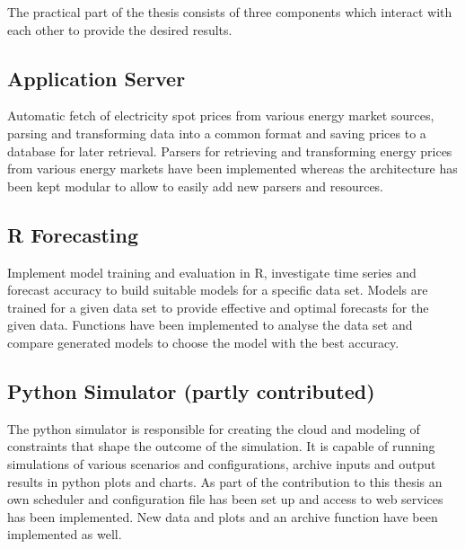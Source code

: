 \documentclass[paper=a4, fontsize=11pt]{scrartcl} %
\numberwithin{equation}{section} %
\numberwithin{figure}{section} %
\numberwithin{table}{section} %
\begin{document}
The practical part of the thesis consists of three components which interact with each other to provide the desired results. 


\subsection{Application Server}

Automatic fetch of electricity spot prices from various energy market sources, parsing and transforming data into a common format and saving prices to a database for later retrieval. Parsers for retrieving and transforming energy prices from various energy markets have been implemented whereas the architecture has been kept modular to allow to easily add new parsers and resources. 


\subsection{R Forecasting}

Implement model training and evaluation in R, investigate time series and forecast accuracy to build suitable models for a specific data set. Models are trained for a given data set to provide effective and optimal forecasts for the given data. Functions have been implemented to analyse the data set and compare generated models to choose the model with the best accuracy. 


\subsection{Python Simulator (partly contributed)}

The python simulator is responsible for creating the cloud and modeling of constraints that shape the outcome of the simulation. It is capable of running simulations of various scenarios and configurations, archive inputs and output results in python plots and charts. As part of the contribution to this thesis an own scheduler and configuration file has been set up and access to web services has been implemented. New data and plots and an archive function have been implemented as well.


\end{document}
